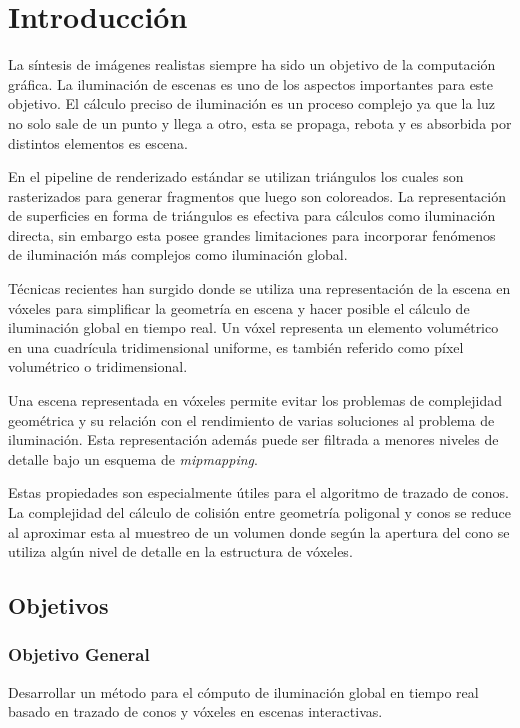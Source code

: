 \chapter*{Introducción}
\label{ch:intro}
La síntesis de imágenes realistas siempre ha sido un objetivo de la computación gráfica. La iluminación de escenas es uno de los aspectos importantes para este objetivo. El cálculo preciso de iluminación es un proceso complejo ya que la luz no solo sale de un punto y llega a otro, esta se propaga, rebota y es absorbida por distintos elementos es escena.

En el pipeline de renderizado estándar se utilizan triángulos los cuales son rasterizados para generar fragmentos que luego son coloreados. La representación de superficies en forma de triángulos es efectiva para cálculos como iluminación directa, sin embargo esta posee grandes limitaciones para incorporar fenómenos de iluminación más complejos como iluminación global.

Técnicas recientes han surgido donde se utiliza una representación de la escena en vóxeles para simplificar la geometría en escena y hacer posible el cálculo de iluminación global en tiempo real. Un vóxel representa un elemento volumétrico en una cuadrícula tridimensional uniforme, es también referido como píxel volumétrico o tridimensional.

Una escena representada en vóxeles permite evitar los problemas de complejidad geométrica y su relación con el rendimiento de varias soluciones al problema de iluminación. Esta representación además puede ser filtrada a menores niveles de detalle bajo un esquema de \emph{mipmapping}. 

Estas propiedades son especialmente útiles para el algoritmo de trazado de conos. La complejidad del cálculo de colisión entre geometría poligonal y conos se reduce al aproximar esta al muestreo de un volumen donde según la apertura del cono se utiliza algún nivel de detalle en la estructura de vóxeles.

\section*{Objetivos} %
\label{sec:section_name}
\subsection*{Objetivo General} %
\label{sub:subsection_name}
Desarrollar un método para el cómputo de iluminación global en tiempo real basado en trazado de conos y vóxeles en escenas interactivas.
